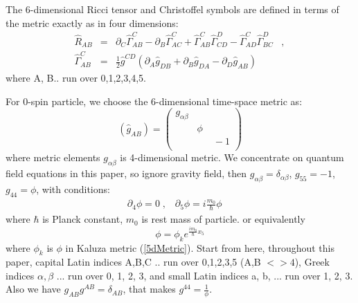 \documentclass[twocolumn,showpacs,preprintnumbers,amsmath,amssymb]{revtex4}
\begin{document}
The 6-dimensional Ricci tensor and Christoffel symbols are defined
in terms of the metric exactly as in four dimensions:
\begin{eqnarray}
\hat{R}_{AB}        & = & \partial_C \hat{\Gamma}^C_{AB} -
                          \partial_B \hat{\Gamma}^C_{AC} +
                          \hat{\Gamma}^C_{AB} \hat{\Gamma}^D_{CD} -
                          \hat{\Gamma}^C_{AD} \hat{\Gamma}^D_{BC} 
                          \; \; \; , \nonumber \\
\hat{\Gamma}^C_{AB} & = & \frac{1}{2} \hat{g}^{CD} \left( 
                          \partial_A \hat{g}_{DB} +
                          \partial_B \hat{g}_{DA} -
                          \partial_D \hat{g}_{AB} \right) \; \; \; 
\label{6dChristRicci}
\end{eqnarray}
where A, B.. run over 0,1,2,3,4,5. 

For 0-spin particle, we choose the 6-dimensional time-space metric as:
\begin{equation}
\left( \hat{g}_{AB} \right) = \left( \begin{array}{cc}
   g_{\alpha\beta} \; \; \; \; \; \;  \; \; \; \; \; \; \\
  \; \; \; \; \; \; \; \; \phi \; \; \; \; \; \; \; \; \\
   \; \; \; \;  \; \; \; \; \; \; \; \; \; \; -1 \\ 
   \end{array} \right) 
\label{6dMetric_0}
\end{equation}
where metric elements $g_{\alpha\beta}$ is 4-dimensional metric. We concentrate on quantum field equations in
this paper, so ignore gravity field, then 
$g_{\alpha\beta} = {\delta}_{\alpha\beta}$, $g_{55} = -1$, $g_{44} = \phi$,
with conditions: 
\begin{eqnarray}
\partial_{4} \phi = 0  \;, \; \;  \;
\partial_{5} \phi =  i\frac{m_0}{\hbar} \phi \; \; \;  \; 
\label{6DCondition} 
\end{eqnarray}
where $\hbar$ is Planck constant, $m_0$ is rest mass of particle. or equivalently
\begin{equation}
\phi =  \phi_k e^{\frac{im_0}{\hbar} x_5} 
\end{equation}
where $\phi_k$ is $\phi$ in Kaluza metric (\ref{5dMetric}). Start from here,
throughout this paper, capital Latin indices 
A,B,C .. run over 0,1,2,3,5 (A,B $<> 4$),
Greek indices $\alpha, \beta$ ... run over 0, 1, 2, 3, and small Latin indices a, b, ... run over 1, 2, 3.
Also we have $g_{AB} g^{AB} = \delta_{AB} $, that makes $g^{44} = \frac{1}{\phi} $. 
\end{document}
